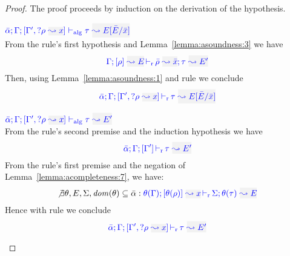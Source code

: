 \begin{proof}
The proof proceeds by induction on the derivation of the hypothesis.
\begin{description}
\setlength{\itemsep}{1em}
\item[\fbox{\rref{Alg-L-RuleMatch}}]\quad$\adlres{\bar\alpha}{\tenv}{\tenv',\envi{\rulet}{x}}{\type}{E[\bar{E}/\bar{x}]}$\ \\

From the rule's first hypothesis and Lemma~\ref{lemma:asoundness:3} we have
\begin{equation*}
\dmres{\tenv}{\rulet}{E}{\type}{E'}{\ie{\ruleset}{\bar{x}}}
\end{equation*}
Then, using Lemma~\ref{lemma:asoundness:1} and rule  we conclude
\begin{equation*}
\dlres{\bar\alpha}{\tenv}{\tenv',\envi{\rulet}{x}}{\type}{E[\bar{E}/\bar{x}]}
\end{equation*}

\item[\fbox{\rref{Alg-L-RuleNoMatch}}]\quad
$\adlres{\bar\alpha}{\tenv}{\tenv',\envi{\rulet}{x}}{\type}{E'}$\ \\

  From the rule's second premise and the induction hypothesis we have
\begin{equation*}
  \dlres{\bar\alpha}{\tenv}{\tenv'}{\type}{E'}
\end{equation*}
From the rule's first premise and the negation of Lemma~\ref{lemma:acompleteness:7}, we have:
\begin{equation*}
\not\exists \theta, E, \Sigma, \dom(\theta) \subseteq \bar{\alpha}:
\dmres{\theta(\tenv)}{\theta(\rulet)}{x}{\theta(\type)}{E}{\Sigma}
\end{equation*}
  Hence with rule  we conclude
\begin{equation*}
   \dlres{\bar\alpha}{\tenv}{\tenv',\envi{\rulet}{x}}{\type}{E'}
\end{equation*}


\end{description}
\end{proof}
